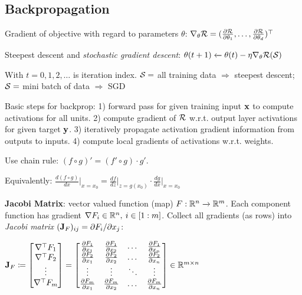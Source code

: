 \subsection{Backpropagation}
\label{sub:backpropagation}
    Gradient of objective with regard to parameters $\theta$: $\nabla_\theta\mathcal{R}=(\frac{\partial\mathcal{R}}{\partial\theta_1},\ldots,\frac{\partial\mathcal{R}}{\partial\theta_d})^{\mathop{\mathrm{\top}}}$
    
    Steepest descent and \emph{stochastic gradient descent}: $\theta(t+1)\xleftarrow{}\theta(t)-\eta\nabla_\theta\mathcal{R}(\mathcal{S})$
    
    With $t=0,1,2,\ldots$ is iteration index. $\mathcal{S}=$ all training data $\Rightarrow$ steepest descent; $\mathcal{S}=$ mini batch of data $\Rightarrow$ SGD
    
    Basic steps for backprop: 1) forward pass for given training input $\mathbf x$ to compute activations for all units. 2) compute gradient of $\mathcal{R}$ w.r.t. output layer activations for given target $\mathbf y$. 3) iteratively propagate activation gradient information from outputs to inputs. 4) compute local gradients of activations w.r.t. weights.
    
    Use chain rule: $(f\circ g)'=(f'\circ g)\cdot g'$. 
    
    Equivalently: $\frac{d(f\circ g)}{dx}\bigr|_{x=x_0}=\frac{df}{dz}\bigr|_{z=g(x_0)}\cdot\frac{dg}{dx}\bigr|_{x=x_0}$
    
    \textbf{Jacobi Matrix}: vector valued function (map) $F:\mathbb R^n\xrightarrow{}\mathbb R^m$. Each component function has gradient $\nabla F_i\in\mathbb R^n,\>i\in\lbrack1:m\rbrack$. Collect all gradients (as rows) into \emph{Jacobi matrix} $(\mathbf J_F)_{ij}=\partial F_i/\partial x_j$:
    
    \tab$\mathbf J_F\coloneqq
    \begin{bmatrix}
    \nabla^{\mathop{\mathrm{\top}}} F_1 \\
    \nabla^{\mathop{\mathrm{\top}}} F_2 \\
    \vdots \\
    \nabla^{\mathop{\mathrm{\top}}} F_m
    \end{bmatrix}
    =
    \begin{bmatrix}
    \frac{\partial F_1}{\partial x_1} & \frac{\partial F_1}{\partial x_2}  & \dots  & \frac{\partial F_1}{\partial x_n} \\
    \frac{\partial F_2}{\partial x_1} & \frac{\partial F_2}{\partial x_2}  & \dots  & \frac{\partial F_2}{\partial x_n} \\
    \vdots & \vdots  & \ddots & \vdots \\
    \frac{\partial F_m}{\partial x_1} & \frac{\partial F_m}{\partial x_2}  & \dots  & \frac{\partial F_m}{\partial x_n}
    \end{bmatrix}
    \in\mathbb R^{m\times n}
    $
    
